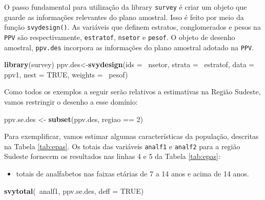\documentclass[]{book}
\newenvironment{Shaded}{\begin{snugshade}}{\end{snugshade}}
\newcommand{\KeywordTok}[1]{\textcolor[rgb]{0.13,0.29,0.53}{\textbf{{#1}}}}
\newcommand{\DataTypeTok}[1]{\textcolor[rgb]{0.13,0.29,0.53}{{#1}}}
\newcommand{\DecValTok}[1]{\textcolor[rgb]{0.00,0.00,0.81}{{#1}}}
\newcommand{\StringTok}[1]{\textcolor[rgb]{0.31,0.60,0.02}{{#1}}}
\newcommand{\OtherTok}[1]{\textcolor[rgb]{0.56,0.35,0.01}{{#1}}}
\newcommand{\NormalTok}[1]{{#1}}
\providecommand{\tightlist}{%
  \setlength{\itemsep}{0pt}\setlength{\parskip}{0pt}}
\theoremstyle{definition}
\theoremstyle{definition}
\theoremstyle{remark}
\begin{document}
O passo fundamental para utilização da library \texttt{survey}
\citep{R-survey} é criar um objeto que guarde as informações relevantes
do plano amostral. Isso é feito por meio da função \texttt{svydesign()}.
As variáveis que definem estratos, conglomerados e pesos na \texttt{PPV}
são respectivamente, \texttt{estratof}, \texttt{nsetor} e
\texttt{pesof}. O objeto de desenho amostral, \texttt{ppv.des} incorpora
as informações do plano amostral adotado na \texttt{PPV}.

\begin{Shaded}
\begin{Highlighting}[]
\KeywordTok{library}\NormalTok{(survey)}
\NormalTok{ppv.des<-}\KeywordTok{svydesign}\NormalTok{(}\DataTypeTok{ids =} \NormalTok{~nsetor, }\DataTypeTok{strata =} \NormalTok{~estratof,}
\DataTypeTok{data =} \NormalTok{ppv1, }\DataTypeTok{nest =} \OtherTok{TRUE}\NormalTok{, }\DataTypeTok{weights =} \NormalTok{~pesof)}
\end{Highlighting}
\end{Shaded}

Como todos os exemplos a seguir serão relativos a estimativas na Região
Sudeste, vamos restringir o desenho a esse domínio:

\begin{Shaded}
\begin{Highlighting}[]
\NormalTok{ppv.se.des <-}\StringTok{ }\KeywordTok{subset}\NormalTok{(ppv.des, regiao ==}\StringTok{ }\DecValTok{2}\NormalTok{)}
\end{Highlighting}
\end{Shaded}

Para exemplificar, vamos estimar algumas características da população,
descritas na Tabela \ref{tab:epas}. Os totais das variáveis
\texttt{analf1} e \texttt{analf2} para a região Sudeste fornecem os
resultados nas linhas 4 e 5 da Tabela \ref{tab:epas}:

\begin{itemize}
\tightlist
\item
  totais de analfabetos nas faixas etárias de 7 a 14 anos e acima de 14
  anos.
\end{itemize}

\begin{Shaded}
\begin{Highlighting}[]
\KeywordTok{svytotal}\NormalTok{(~analf1, ppv.se.des, }\DataTypeTok{deff =} \OtherTok{TRUE}\NormalTok{)}
\end{Highlighting}
\end{Shaded}
\end{document}
